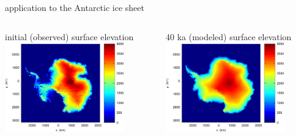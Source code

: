 \begin{frame}{application to the Antarctic ice sheet}
\vspace{-0.15in}
\begin{columns}
\begin{column}{0.5\textwidth}
\begin{center}
\scriptsize
initial (observed) surface elevation
\includegraphics[width=0.8\textwidth]{photos/antinitial}
\end{center}
\end{column}
\begin{column}{0.5\textwidth}
\begin{center}
\scriptsize
40 ka (modeled) surface elevation
\includegraphics[width=0.8\textwidth]{photos/antfinal}
\end{center}
\end{column}
\end{columns}
\end{frame}


